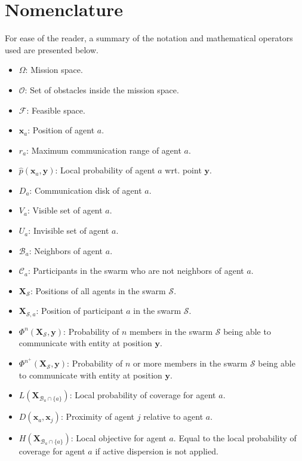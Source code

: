
\section{Nomenclature}
For ease of the reader, a summary of the notation and mathematical operators used are presented below.
\begin{itemize}
  \item $\Omega$: Mission space.
  \item $\mathcal{O}$: Set of obstacles inside the mission space.
  \item $\mathcal{F}$: Feasible space.
  \item $\mathbf{x}_{a}$: Position of agent $a$.
  \item $r_{a}$: Maximum communication range of agent $a$.
  \item $\hat{p}(\mathbf{x}_{a}, \mathbf{y})$: Local probability of agent $a$ wrt. point $\mathbf{y}$.
  \item $D_{a}$: Communication disk of agent $a$.
  \item $V_{a}$: Visible set of agent $a$.
  \item $U_{a}$: Invisible set of agent $a$.
  \item $\mathcal{B}_{a}$: Neighbors of agent $a$.
  \item $\mathcal{C}_{a}$: Participants in the swarm who are not neighbors of agent $a$.
  \item $\mathbf{X}_{\mathcal{S}}$: Positions of all agents in the swarm $\mathcal{S}$.
  \item $\mathbf{X}_{\mathcal{S}, a}$: Position of participant $a$ in the swarm $\mathcal{S}$.
  \item $\Phi^{n}(\mathbf{X_{\mathcal{S}}}, \mathbf{y})$: Probability of $n$ members in the swarm $\mathcal{S}$ being able to communicate with entity at position $\mathbf{y}$.
  \item $\Phi^{n^{+}}(\mathbf{X_{\mathcal{S}}}, \mathbf{y})$: Probability of $n$ or more members in the swarm $\mathcal{S}$ being able to communicate with entity at position $\mathbf{y}$.
  \item $L(\mathbf{X}_{\mathcal{B}_{a}\cap\{a\}})$: Local probability of coverage for agent $a$.
  \item $D(\mathbf{x}_{a}, \mathbf{x}_{j})$: Proximity of agent $j$ relative to agent $a$.
  \item $H(\mathbf{X}_{\mathcal{B}_{a}\cap\{a\}})$: Local objective for agent $a$. Equal to the local probability of coverage for agent $a$ if active dispersion is not applied.
\end{itemize}

